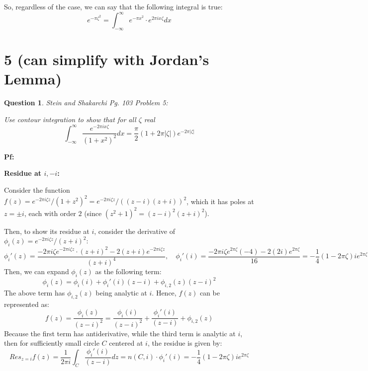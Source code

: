 \documentclass{article}
\newtheorem{question}{Question}
\begin{document}
\hfil

So, regardless of the case, we can say that the following integral is true:
$$e^{-\pi \zeta^2} = \int_{-\infty}^{\infty}e^{-\pi x^2}\cdot e^{2\pi ix\zeta}dx$$

\break

\section*{5 (can simplify with Jordan's Lemma)}
\begin{myBox}[]{}
    \begin{question}
        Stein and Shakarchi Pg. 103 Problem 5:

        Use contour integration to show that for all $\zeta$ real
        $$\int_{-\infty}^{\infty}\frac{e^{-2\pi ix\zeta}}{(1+x^2)^2}dx = \frac{\pi}{2}(1+2\pi |\zeta|)e^{-2\pi |\zeta|}$$
    \end{question}
\end{myBox}

\textbf{Pf:}

\textbf{Residue at $i,-i$:}

Consider the function $f(z)=e^{-2\pi i\zeta z}/(1+z^2)^2 = e^{-2\pi i\zeta z}/((z-i)(z+i))^2$, which it has poles at $z=\pm i$, each with order $2$ (since $(z^2+1)^2=(z-i)^2(z+i)^2$).

Then, to show its residue at $i$, consider the derivative of $\phi_i(z)=e^{-2\pi i\zeta z}/(z+i)^2$:
$$\phi_i'(z) = \frac{-2\pi i\zeta e^{-2\pi i\zeta z}\cdot (z+i)^2-2(z+i)e^{-2\pi i\zeta z}}{(z+i)^4}, \quad\phi_i'(i)=\frac{-2\pi i\zeta e^{2\pi \zeta}(-4)-2(2i)e^{2\pi \zeta}}{16} = -\frac{1}{4}(1-2\pi \zeta)ie^{2\pi \zeta}$$
Then, we can expand $\phi_i(z)$ as the following term:
$$\phi_i(z) = \phi_i(i)+\phi_i'(i)(z-i)+\phi_{i,2}(z)(z-i)^2$$
The above term has $\phi_{i,2}(z)$ being analytic at $i$. Hence, $f(z)$ can be represented as:
$$f(z)=\frac{\phi_i(z)}{(z-i)^2}=\frac{\phi_i(i)}{(z-i)^2}+\frac{\phi_i'(i)}{(z-i)}+\phi_{i,2}(z)$$
Because the first term has antiderivative, while the third term is analytic at $i$, then for sufficiently small circle $C$ centered at $i$, the residue is given by:
$$Res_{z=i}f(z)=\frac{1}{2\pi i}\int_{C}\frac{\phi_i'(i)}{(z-i)}dz = n(C,i)\cdot \phi_i'(i) = -\frac{1}{4}(1-2\pi \zeta)ie^{2\pi \zeta}$$

\hfil
\end{document}
